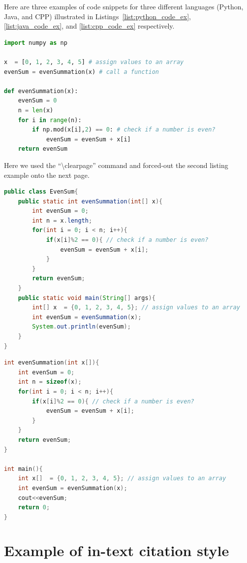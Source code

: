 Here are three examples of code snippets for three different languages (Python, Java, and CPP) illustrated in Listings~\ref{list:python_code_ex}, \ref{list:java_code_ex}, and \ref{list:cpp_code_ex} respectively.  

\begin{lstlisting}[language=Python, caption={Code snippet in \LaTeX ~and  this is a Python code example}, label=list:python_code_ex]
import numpy as np

x  = [0, 1, 2, 3, 4, 5] # assign values to an array
evenSum = evenSummation(x) # call a function

def evenSummation(x):
    evenSum = 0
    n = len(x)
    for i in range(n):
        if np.mod(x[i],2) == 0: # check if a number is even?
            evenSum = evenSum + x[i]
    return evenSum
\end{lstlisting}

Here we used  the ``\textbackslash clearpage'' command and forced-out the second listing example onto the next page. 
\clearpage  %
\begin{lstlisting}[language=Java, caption={Code snippet in \LaTeX ~and  this is a Java code example}, label=list:java_code_ex]
public class EvenSum{ 
    public static int evenSummation(int[] x){
        int evenSum = 0;
        int n = x.length;
        for(int i = 0; i < n; i++){
            if(x[i]%2 == 0){ // check if a number is even?
                evenSum = evenSum + x[i];
            }
        }
        return evenSum;     
    }
    public static void main(String[] args){ 
        int[] x  = {0, 1, 2, 3, 4, 5}; // assign values to an array
        int evenSum = evenSummation(x);
        System.out.println(evenSum);
    } 
} 
\end{lstlisting}


\begin{lstlisting}[language=C, caption={Code snippet in \LaTeX ~and  this is a C/C++ code example}, label=list:cpp_code_ex]
int evenSummation(int x[]){
    int evenSum = 0;
    int n = sizeof(x);
    for(int i = 0; i < n; i++){
        if(x[i]%2 == 0){ // check if a number is even?
            evenSum = evenSum + x[i];
    	}
    }
    return evenSum;     
}

int main(){
    int x[]  = {0, 1, 2, 3, 4, 5}; // assign values to an array
    int evenSum = evenSummation(x);
    cout<<evenSum;
    return 0;
}
\end{lstlisting}



\section{Example of in-text citation style}
